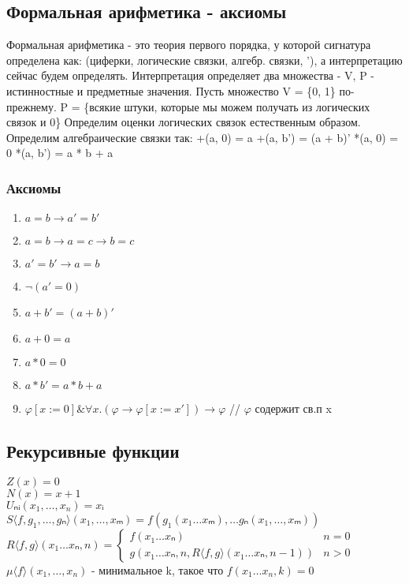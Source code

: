 \documentclass[12pt]{article}
\renewcommand{\phi}{\varphi}
\newcommand{\ltemplate}{\langle}
\newcommand{\rtemplate}{\rangle}
\begin{document}
\subsection{Формальная арифметика - аксиомы}
\label{sec-2-20}
Формальная арифметика - это теория первого порядка, у которой
сигнатура определена как: (циферки, логические связки, алгебр.
связки, '), а интерпретацию сейчас будем определять.
Интерпретация определяет два множества - V, P - истинностные и
предметные значения. Пусть множество V = \{0, 1\} по-прежнему.
P = \{всякие штуки, которые мы можем получать из логических связок и 0\}
Определим оценки логических связок естественным образом.
Определим алгебраические связки так:
+(a, 0) = a
+(a, b') = (a + b)'
*(a, 0) = 0
*(a, b') = a * b + a
\subsubsection{Аксиомы}
\label{sec-2-20-1}
\begin{enumerate}
\item $a = b \to a' = b'$
\item $a = b \to a = c \to b = c$
\item $a' = b' \to a = b$
\item $\lnot (a' = 0)$
\item $a + b' = (a + b)'$
\item $a + 0 = a$
\item $a * 0 = 0$
\item $a * b' = a * b + a$
\item $\phi[x:=0] \& ∀x.(\phi \to \phi[x:=x']) \to \phi$ // $\phi$ содержит св.п x
\end{enumerate}
\subsection{Рекурсивные функции}
\label{sec-2-21}
$Z(x) = 0$\\
$N(x) = x + 1$\\
$Uₙᵢ(x_1,\dotsc, x_n) = xᵢ$\\
$S\ltemplate f, g_1, \dotsc, gₙ\rtemplate (x_1,\dotsc,xₘ) = f(g_1(x_1\ldots{}xₘ),\ldots{}gₙ(x_1,\dotsc,xₘ))$\\
$R\ltemplate f, g\rtemplate(x_1\ldots{}xₙ, n) = \begin{cases}
    f(x_1\ldots{}xₙ) & n = 0 \\
    g(x_1\ldots{}xₙ, n, R\ltemplate f, g\rtemplate(x_1\ldots{}xₙ, n - 1)) & n > 0
\end{cases}$\\
$\mu\ltemplate f\rtemplate(x_1, \dotsc, x_n)$ - минимальное k, такое что $f(x_1\ldots{}x_n, k) = 0$
\end{document}

